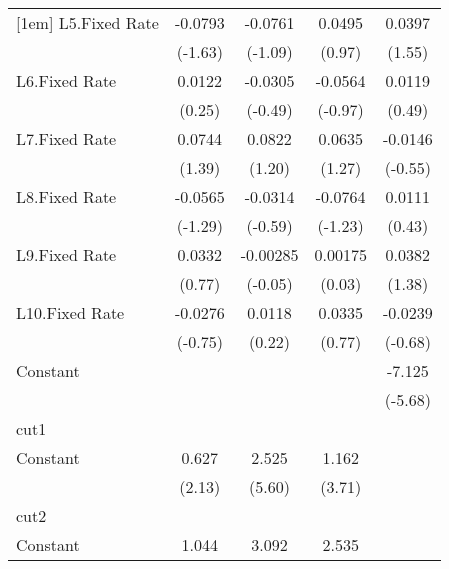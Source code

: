 {\begin{longtable}{l*{4}{c}}
[1em]
L5.Fixed Rate   &  -0.0793         &  -0.0761         &   0.0495         &   0.0397         \\
                &  (-1.63)         &  (-1.09)         &   (0.97)         &   (1.55)         \\
[1em]
L6.Fixed Rate   &   0.0122         &  -0.0305         &  -0.0564         &   0.0119         \\
                &   (0.25)         &  (-0.49)         &  (-0.97)         &   (0.49)         \\
[1em]
L7.Fixed Rate   &   0.0744         &   0.0822         &   0.0635         &  -0.0146         \\
                &   (1.39)         &   (1.20)         &   (1.27)         &  (-0.55)         \\
[1em]
L8.Fixed Rate   &  -0.0565         &  -0.0314         &  -0.0764         &   0.0111         \\
                &  (-1.29)         &  (-0.59)         &  (-1.23)         &   (0.43)         \\
[1em]
L9.Fixed Rate   &   0.0332         & -0.00285         &  0.00175         &   0.0382         \\
                &   (0.77)         &  (-0.05)         &   (0.03)         &   (1.38)         \\
[1em]
L10.Fixed Rate  &  -0.0276         &   0.0118         &   0.0335         &  -0.0239         \\
                &  (-0.75)         &   (0.22)         &   (0.77)         &  (-0.68)         \\
[1em]
Constant        &                  &                  &                  &   -7.125\sym{***}\\
                &                  &                  &                  &  (-5.68)         \\
\hline
cut1            &                  &                  &                  &                  \\
Constant        &    0.627\sym{*}  &    2.525\sym{***}&    1.162\sym{***}&                  \\
                &   (2.13)         &   (5.60)         &   (3.71)         &                  \\
\hline
cut2            &                  &                  &                  &                  \\
Constant        &    1.044\sym{***}&    3.092\sym{***}&    2.535\sym{***}&                  \\

\end{longtable}}
